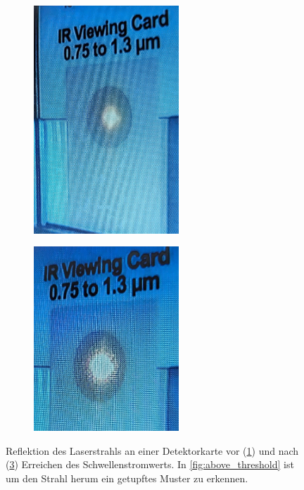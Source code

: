 \begin{figure}
    \begin{subfigure}[c]{0.5\textwidth}
        \centering
        \includegraphics[width=0.6\textwidth]{bilder/under_threshold.jpg}
        \label{fig:under_threshold}
    \end{subfigure}
    \begin{subfigure}[c]{0.5\textwidth}
        \centering
        \includegraphics[width=0.6\textwidth]{bilder/above_threshold.jpg}
        \label{fig:above_threshold}
    \end{subfigure}
    \caption{Reflektion des Laserstrahls an einer Detektorkarte vor (\ref{fig:under_threshold}) und nach (\ref{fig:above_threshold}) Erreichen des Schwellenstromwerts. In \autoref{fig:above_threshold} ist um den Strahl herum ein getupftes Muster zu erkennen.}
\end{figure}

